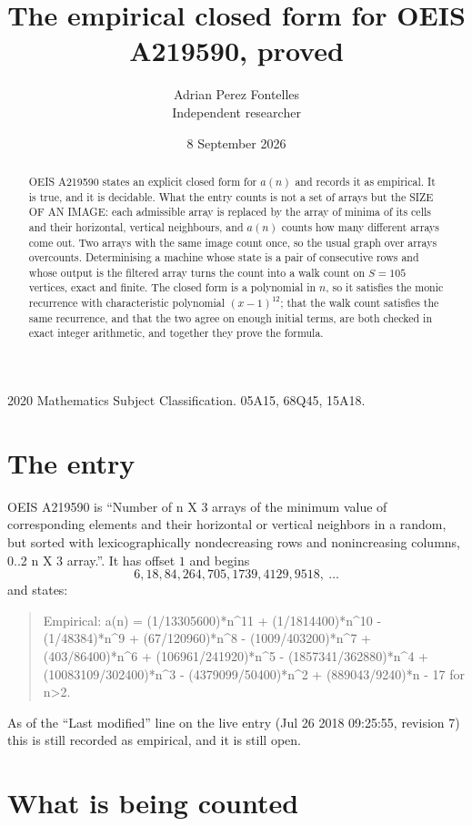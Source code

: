 \documentclass[11pt,a4paper]{article}
\title{The empirical closed form for OEIS A219590, proved}
\author{Adrian Perez Fontelles\\ \small Independent researcher}
\date{8 September 2026}
\theoremstyle{plain}
\theoremstyle{definition}
\begin{document}
\maketitle

\begin{abstract}
OEIS A219590 states an explicit closed form for $a(n)$ and records it as empirical. It is true, and
it is decidable. What the entry counts is not a set of arrays but the SIZE OF AN IMAGE: each
admissible array is replaced by the array of minima of its cells and their horizontal, vertical neighbours,
and $a(n)$ counts how many different arrays come out. Two arrays with the same image count
once, so the usual graph over arrays overcounts. Determinising a machine whose state is a pair
of consecutive rows and whose output is the filtered array turns the count into a walk count on
$S=105$ vertices, exact and finite. The closed form is a polynomial in $n$, so it satisfies the
monic recurrence with characteristic polynomial $(x-1)^{12}$; that the walk count
satisfies the same recurrence, and that the two agree on enough initial terms, are both checked
in exact integer arithmetic, and together they prove the formula.
\end{abstract}

\noindent\small 2020 Mathematics Subject Classification. 05A15, 68Q45, 15A18.\normalsize

\section{The entry}

OEIS A219590 is ``Number of n X 3 arrays of the minimum value of corresponding elements and their horizontal or vertical neighbors in a random, but sorted with lexicographically nondecreasing rows and nonincreasing columns, 0..2 n X 3 array.''. It has offset $1$ and begins
\[
6, 18, 84, 264, 705, 1739, 4129, 9518,\ \dots
\]
and states:
\begin{quote}
Empirical: a(n) = (1/13305600)*n\^{}11 + (1/1814400)*n\^{}10 - (1/48384)*n\^{}9 + (67/120960)*n\^{}8 - (1009/403200)*n\^{}7 + (403/86400)*n\^{}6 + (106961/241920)*n\^{}5 - (1857341/362880)*n\^{}4 + (10083109/302400)*n\^{}3 - (4379099/50400)*n\^{}2 + (889043/9240)*n - 17 for n>2.
\end{quote}
As of the ``Last modified'' line on the live entry (Jul 26 2018 09:25:55, revision 7)
this is still recorded as empirical, and it is still open.

\section{What is being counted}
\end{document}
